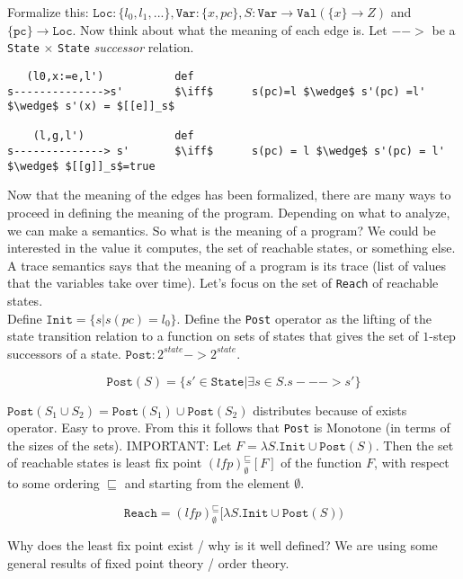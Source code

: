 \documentclass[11pt]{article}
\theoremstyle{definition}
\theoremstyle{plain}
\begin{document}
\noindent Formalize this: $\texttt{Loc}: \{l_0,l_1,...\}, \texttt{Var}: \{x,pc\}, 
S: \texttt{Var} \rightarrow \texttt{Val} (\{x\} \rightarrow Z)$ and $\{\texttt{pc}\} \rightarrow \texttt{Loc}$. 
Now think about what the meaning of each edge is. Let $-->$ be a \texttt{State} $\times$ \texttt{State} \textit{successor} relation.


\begin{lstlisting}
   (l0,x:=e,l')           def
s-------------->s'        $\iff$      s(pc)=l $\wedge$ s'(pc) =l' $\wedge$ s'(x) = $[[e]]_s$

    (l,g,l')              def
s--------------> s'       $\iff$      s(pc) = l $\wedge$ s'(pc) = l' $\wedge$ $[[g]]_s$=true

\end{lstlisting}

\noindent Now that the meaning of the edges has been formalized, there are many ways
to proceed in defining the meaning of the program. Depending on what to analyze,
we can make a semantics. So what is the meaning of a program? We could be
interested in the value it computes, the set of reachable states, or something else.
A trace semantics says that the meaning of a program is its trace (list of values that the variables
take over time). Let's focus on the set of \texttt{Reach} of reachable states.\\

\noindent Define $\texttt{Init} = \{s|s(pc)=l_0\}$. Define the \texttt{Post} operator as the lifting of the state transition relation
to a function on sets of states that gives the set of $1$-step successors of a state. $\texttt{Post}: 2^{state} -> 2^{state}$. 

$$\texttt{Post}(S) = \{s' \in \texttt{State} | \exists s \in S.s--->s'\}$$

\noindent $ \texttt{Post}(S_1 \cup S_2) = \texttt{Post}(S_1) \cup \texttt{Post}(S_2)$ distributes because of exists operator. Easy to prove.
From this it follows that \texttt{Post} is Monotone (in terms of the sizes of the sets). IMPORTANT: Let $F = \lambda S. \texttt{Init} \cup \texttt{Post}(S)$.
Then the set of reachable states is least fix point $(lfp)_\emptyset^\sqsubseteq[F]$ of the function $F$, with respect to some ordering $\sqsubseteq$
and starting from the element $\emptyset$. 

$$\texttt{Reach} = (lfp)_\emptyset^\sqsubseteq[\lambda S. \texttt{Init} \cup \texttt{Post}(S))$$


\noindent Why does the least fix point exist / why is it well defined? We are using some general results of fixed point theory / order theory.\\
\end{document}
